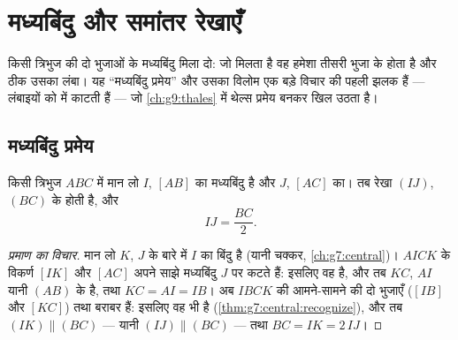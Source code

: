 \chapter{मध्यबिंदु और समांतर रेखाएँ}\label{ch:g8:midpoints}

किसी त्रिभुज की दो भुजाओं के मध्यबिंदु मिला दो: जो  मिलता है
वह हमेशा तीसरी भुजा के  होता है और ठीक उसका  लंबा। यह
``मध्यबिंदु प्रमेय'' और उसका विलोम एक बड़े विचार की पहली झलक हैं ---
 लंबाइयों को  में काटती हैं --- जो
\cref{ch:g9:thales} में थेल्स प्रमेय बनकर खिल उठता है।

\section{मध्यबिंदु प्रमेय}

\begin{theorem}[मध्यबिंदु प्रमेय]\label{thm:g8:midpoints:direct}
किसी त्रिभुज $ABC$ में मान लो $I$, $[AB]$ का मध्यबिंदु है और $J$,
$[AC]$ का। तब रेखा $(IJ)$, $(BC)$ के  होती है, और
\[
IJ = \frac{BC}{2} .
\]
\end{theorem}

\begin{proof}[प्रमाण का विचार]
मान लो $K$, $J$ के बारे में $I$ का  बिंदु है (यानी  चक्कर,
\cref{ch:g7:central})।  $AICK$ के विकर्ण $[IK]$ और $[AC]$
अपने साझे मध्यबिंदु $J$ पर कटते हैं: इसलिए वह  है,
और तब $KC$, $AI$ यानी $(AB)$ के  है, तथा $KC = AI = IB$। अब
$IBCK$ की आमने-सामने की दो भुजाएँ ($[IB]$ और $[KC]$)  तथा
बराबर हैं: इसलिए वह भी  है
(\cref{thm:g7:central:recognize}), और तब
$(IK) \parallel (BC)$ --- यानी $(IJ) \parallel (BC)$ --- तथा
$BC = IK = 2\,IJ$।
\end{proof}

